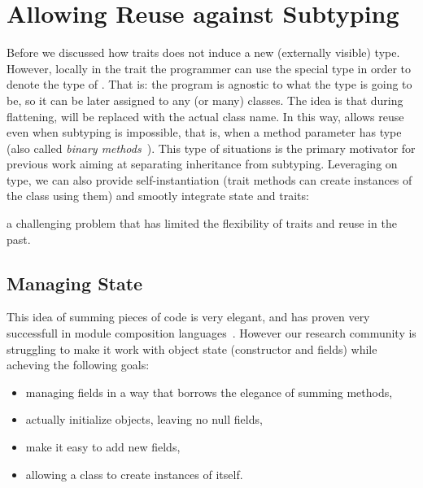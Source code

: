 \section{Allowing Reuse against Subtyping}
Before we discussed how traits does not induce a new (externally visible) type.
However, locally in the trait the programmer can use the special type \Q@This@ in order to denote the 
type of \Q@this@.
That is: the program is agnostic to what the \Q@This@ type is going to be, so it can
be later assigned to any (or many) classes. 
The idea is that during flattening, \Q@This@ will be replaced with the actual class name.
In this way, \name allows reuse even when subtyping is
impossible, that is, when a method parameter has type \Q@This@ (also called \emph{binary
  methods}~\cite{}). 
This type of situations is the primary motivator
for previous work aiming at separating inheritance from subtyping.
Leveraging on \Q@This@ type, we can also provide self-instantiation (trait methods can create instances of the class using them) and smootly integrate state and traits: 


a challenging problem that has limited the flexibility of traits and
reuse in the past.

\subsection{Managing State}

This idea of summing pieces of code is very elegant, and has proven
very successfull in module composition
languages~\cite{ancona2002calculus}. 
However our research community is
struggling to make it work with object state (constructor and fields)
while acheving the following goals:

\begin{itemize}
\item managing fields in a way that borrows the elegance of summing methods,
\item actually initialize objects, leaving no null fields,
\item make it easy to add new fields,
\item allowing a class to create instances of itself.
\end{itemize}

